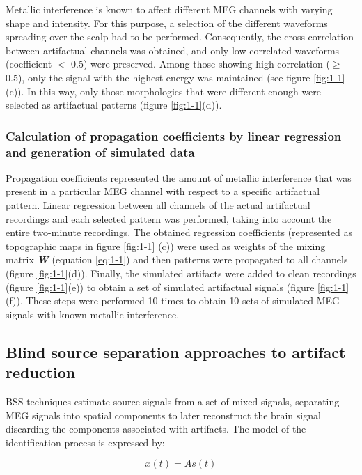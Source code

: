 Metallic interference is known to affect different MEG channels with varying shape and intensity. For this purpose, a selection of the different waveforms spreading over the scalp had to be performed. Consequently, the cross-correlation between artifactual channels was obtained, and only low-correlated waveforms (coefficient $<$ 0.5) were preserved. Among those showing high correlation ($\geq$ 0.5), only the signal with the highest energy was maintained (see figure \ref{fig:1-1}(c)). In this way, only those morphologies that were different enough were selected as artifactual patterns (figure \ref{fig:1-1}(d)).

\subsubsection*{Calculation of propagation coefficients by linear regression and generation of simulated data}

Propagation coefficients represented the amount of metallic interference that was present in a particular MEG channel with respect to a specific artifactual pattern. Linear regression between all channels of the actual artifactual recordings and each selected pattern was performed, taking into account the entire two-minute recordings. The obtained regression coefficients (represented as topographic maps in figure \ref{fig:1-1} (c)) were used as weights of the mixing matrix \textbf{\textit{W}} (equation \ref{eq:1-1}) and then patterns were propagated to all channels (figure \ref{fig:1-1}(d)). Finally, the simulated artifacts were added to clean recordings (figure \ref{fig:1-1}(e)) to obtain a set of simulated artifactual signals (figure \ref{fig:1-1}(f)). These steps were performed 10 times to obtain 10 sets of simulated MEG signals with known metallic interference.

\subsection{Blind source separation approaches to artifact reduction}

BSS techniques estimate source signals from a set of mixed signals, separating MEG signals into spatial components to later reconstruct the brain signal discarding the components associated with artifacts. The model of the identification process is expressed by:

\begin{equation} \label{eq:1-2}
x(t)=As(t)
\end{equation}

